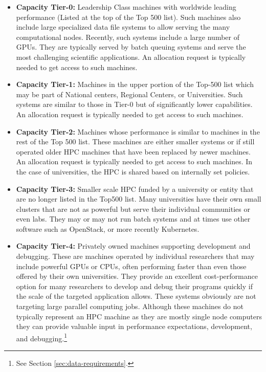\documentclass[utf8]{FrontiersinVancouver} %
\begin{document}
\begin{itemize}
\item {\bf Capacity Tier-0:} Leadership Class machines with worldwide leading
  performance (Listed at the top of the Top 500 list). Such machines also include large specialized data file systems to allow serving the many computational nodes. Recently, such systems include a large number of GPUs. They are typically served by batch queuing systems and serve the most challenging scientific applications. An allocation request is typically needed to get access to such machines.
\item {\bf Capacity Tier-1:} Machines in the upper portion of the Top-500 list which may be part of National centers, Regional Centers, or Universities. Such systems are similar to those in Tier-0 but of significantly lower capabilities.
An allocation request is typically needed to get access to such machines.
\item {\bf Capacity Tier-2:} Machines whose performance is similar to machines
  in the rest of the Top 500 list. These machines are either smaller systems or if still operated older HPC machines that have been replaced by newer machines.
  An allocation request is typically needed to get access to such machines. In the case of universities, the HPC is shared based on internally set policies.
\item {\bf Capacity Tier-3:} Smaller scale HPC funded by a university or entity
  that are no longer listed in the Top500 list. Many universities have their own small clusters that are not as powerful but serve their individual communities or even labs. They may or may not run batch systems and at times use other software such as OpenStack, or more recently Kubernetes. 
\item {\bf Capacity Tier-4:} Privately owned machines supporting development
  and debugging. These are machines operated by individual researchers that may include powerful GPUs or CPUs, often performing faster than even those offered by their own universities. They provide an excellent cost-performance option for many researchers to develop and debug their programs quickly if the scale of the targeted application allows. These systems obviously are not targeting large parallel computing jobs. Although these machines do not typically represent an HPC machine as they are mostly single node  computers they can provide valuable input in performance expectations, development, and debugging.\footnote{See Section \ref{sec:data-requirements}.}
  
\end{itemize}
\end{document}
